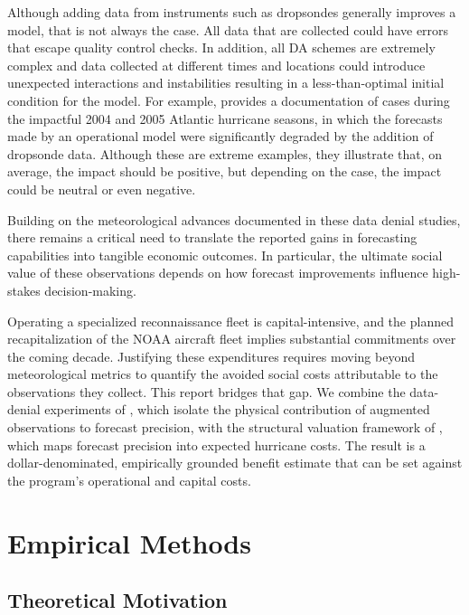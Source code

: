 \documentclass[12pt]{article}%
\begin{document}
Although adding data from instruments such as dropsondes generally improves a model, that is not always the case. All data that are collected could have errors that escape quality control checks. In addition, all DA schemes are extremely complex and data collected at different times and locations could introduce unexpected interactions and instabilities resulting in a less-than-optimal initial condition for the model. For example, \citet{Aberson2008} provides a documentation of cases during the impactful 2004 and 2005 Atlantic hurricane seasons, in which the forecasts made by an operational model were significantly degraded by the addition of dropsonde data. Although these are extreme examples, they illustrate that, on average, the impact should be positive, but depending on the case, the impact could be neutral or even negative. 

Building on the meteorological advances documented in these data denial studies, there remains a critical need to translate the reported gains in forecasting capabilities into tangible economic outcomes. In particular, the ultimate social value of these observations depends on how forecast improvements influence high-stakes decision-making.

Operating a specialized reconnaissance fleet is capital-intensive, and the planned recapitalization of the NOAA aircraft fleet implies substantial commitments over the coming decade. Justifying these expenditures requires moving beyond meteorological metrics to quantify the avoided social costs attributable to the observations they collect. This report bridges that gap. We combine the data-denial experiments of \citet{DitchekEA2023}, which isolate the physical contribution of augmented observations to forecast precision, with the structural valuation framework of \citet{molina2024social}, which maps forecast precision into expected hurricane costs. The result is a dollar-denominated, empirically grounded benefit estimate that can be set against the program's operational and capital costs.





\section{Empirical Methods} \label{sec:methods}

\subsection{Theoretical Motivation}\label{sec:theory}
\end{document}
